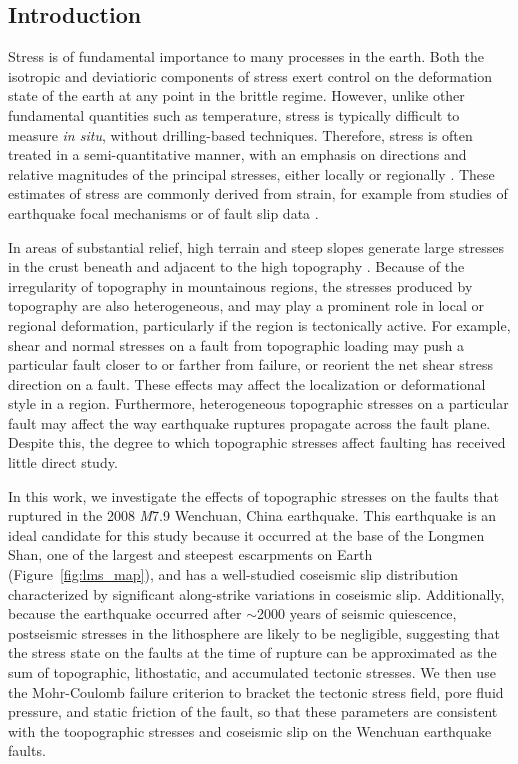 \documentclass[draft,jgrga]{AGUTeX}
\begin{document}
\begin{article} \section{Introduction}\label{introduction}
Stress is of fundamental importance to many processes in the earth. Both the
isotropic and deviatioric components of stress exert control on the deformation
state of the earth at any point in the brittle regime. However, unlike other
fundamental quantities such as temperature, stress is typically difficult to
measure \emph{in situ}, without drilling-based techniques. Therefore, stress is
often treated in a semi-quantitative manner, with an emphasis on directions and
relative magnitudes of the principal stresses, either locally or regionally
\citep[e.g.,][]{angelier1994}. These estimates of stress are commonly derived
from strain, for example from studies of earthquake focal mechanisms
\citep[e.g.,][]{michael1987} or of fault slip data \citep[e.g.,][]{reches1987,
medinaluna2013}.

In areas of substantial relief, high terrain and steep slopes generate large
stresses in the crust beneath and adjacent to the high topography
\citep{jeffreys1924, coblentz1996}. Because of the irregularity of topography
in mountainous regions, the stresses produced by topography are also
heterogeneous, and may play a prominent role in local or regional deformation,
particularly if the region is tectonically active.  For example, shear and
normal stresses on a fault from topographic loading may push a particular fault
closer to or farther from failure, or reorient the
net shear stress direction on a fault. These effects may affect the
localization or deformational style in a region. Furthermore, heterogeneous
topographic stresses on a particular fault may affect the way earthquake
ruptures propagate across the fault plane. Despite this, the degree to which
topographic stresses affect faulting has received little direct study.

In this work, we investigate the effects of topographic stresses on the faults
that ruptured in the 2008 \emph{M}7.9 Wenchuan, China earthquake.  This
earthquake is an ideal candidate for this study because it occurred at the base
of the Longmen Shan, one of the largest and steepest escarpments on Earth
(Figure~\ref{fig:lms_map}), and has a well-studied coseismic slip distribution
characterized by significant along-strike variations in coseismic slip.
Additionally, because the earthquake occurred after $\sim$2000 years
of seismic quiescence, postseismic stresses in the lithosphere are likely to be
negligible, suggesting that the stress state on the faults at the time of
rupture can be approximated as the sum of topographic, lithostatic, and
accumulated tectonic stresses. We then use the Mohr-Coulomb failure criterion
to bracket the tectonic stress field, pore fluid pressure, and static friction
of the fault, so that these parameters are consistent with the toopographic
stresses and coseismic slip on the Wenchuan earthquake faults.


\end{article}
\end{document}

